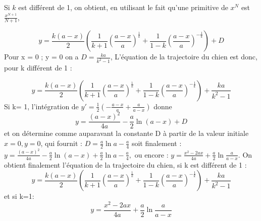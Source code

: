 \begin{Answer}
Si $k$ est différent de 1, on obtient, en utilisant le fait qu’une primitive de $x^N$ est $\frac{x^{N+1}}{N+1}$,

\[ y=\frac{k(a-x)}{2}\left(\frac{1}{k+1}\left(\frac{a-x}{a}\right)^{\frac{1}{k}}+\frac{1}{1-k}\left(\frac{a-x}{a}\right)^{-\frac{1}{k}}\right)+D\]
Pour x = 0 ; y = 0 on a $D= \frac{ka}{k^2-1} $,
L'équation de la trajectoire du chien est donc, pour k différent de 1  :

\[y = \frac{k(a-x)}{2}(\frac{1}{k+1}(\frac{a-x}{a})^{\frac{1}{k}}+\frac{1}{1-k}(\frac{a-x}{a})^{-\frac{1}{k}})+\frac{ka}{k^2-1} \]
Si k= 1, l’intégration de
$ y'=\frac{1}{2}(-\frac{a-x}{a}+\frac{a}{a-x})$ donne \[y=\frac{(a-x)^2}{4a}-\frac{a}{2}\ln (a-x) +D\]
 et on détermine comme auparavant la constante D à partir de la valeur initiale $x=0, y=0$,  qui fournit : $D=\frac{a}{2}\ln a-\frac{a}{4}$
soit finalement :
$y=\frac{(a-x)^2}{4a}-\frac{a}{2}\ln (a-x) +\frac{a}{2}\ln a-\frac{a}{4},$
ou encore :
$y=\frac{x^2-2ax}{4a}+\frac{a}{2}\ln{\frac{a}{a-x}}.$
On obtient finalement l'équation de la trajectoire du chien, si k est différent de 1 :
\[y = \frac{k(a-x)}{2}\left(\frac{1}{k+1}\left(\frac{a-x}{a}\right)^{\frac{1}{k}}+\frac{1}{1-k}\left(\frac{a-x}{a}\right)^{-\frac{1}{k}}\right)+\frac{ka}{k^2-1} \]
et si k=1:
\[y=\frac{x^2-2ax}{4a}+\frac{a}{2}\ln{\frac{a}{a-x}}\]

\end{Answer}
